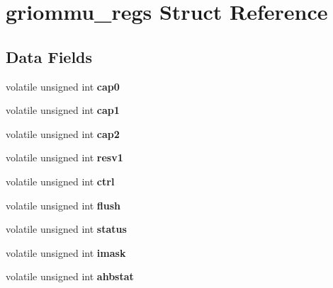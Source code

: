 \hypertarget{structgriommu__regs}{}\section{griommu\+\_\+regs Struct Reference}
\label{structgriommu__regs}
\subsection*{Data Fields}
\begin{DoxyCompactItemize}
\item 
\mbox{\label{structgriommu__regs_a7c5ac1a8eba2ea011c63486c4ea6e680}} 
volatile unsigned int {\bfseries cap0}
\item 
\mbox{\label{structgriommu__regs_a8c5f3fa35eba36cc9e2263792e1f7d0e}} 
volatile unsigned int {\bfseries cap1}
\item 
\mbox{\label{structgriommu__regs_a7390f34a35b79d5cdcf1b6f1fefab106}} 
volatile unsigned int {\bfseries cap2}
\item 
\mbox{\label{structgriommu__regs_a5ed759c0c6b5e17ccfc42d3f570bbc98}} 
volatile unsigned int {\bfseries resv1}
\item 
\mbox{\label{structgriommu__regs_a0c879d413206974ec378f8698252f442}} 
volatile unsigned int {\bfseries ctrl}
\item 
\mbox{\label{structgriommu__regs_a547065d2c4c43c02ff0b9a109191a88f}} 
volatile unsigned int {\bfseries flush}
\item 
\mbox{\label{structgriommu__regs_a71a18bdb93897af29f75247852eeaed1}} 
volatile unsigned int {\bfseries status}
\item 
\mbox{\label{structgriommu__regs_ae8708756edb5e19ca0783cec696d8d5b}} 
volatile unsigned int {\bfseries imask}
\item 
\mbox{\label{structgriommu__regs_a85787fd5dac702ab6e0782dfe9f467c0}} 
volatile unsigned int {\bfseries ahbstat}
\item 

\end{DoxyCompactItemize}
